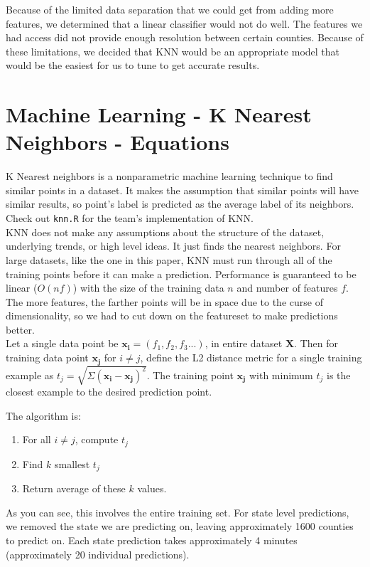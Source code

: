\documentclass[11pt]{article}
\begin{document}
Because of the limited data separation that we could get from adding more features, we determined that a linear classifier would not do well. The features we had access did not provide enough resolution between certain counties. Because of these limitations, we decided that KNN would be an appropriate model that would be the easiest for us to tune to get accurate results.
\newpage

\section*{Machine Learning - K Nearest Neighbors - Equations}
K Nearest neighbors is a nonparametric machine learning technique to find similar points in a dataset. It makes the assumption that similar points will have similar results, so point's label is predicted as the average label of its neighbors. Check out \texttt{knn.R} for the team's implementation of KNN. \\ 
KNN does not make any assumptions about the structure of the dataset, underlying trends, or high level ideas. It just finds the nearest neighbors. For large datasets, like the one in this paper, KNN must run through all of the training points before it can make a prediction. Performance is guaranteed to be linear ($O(nf)$) with the size of the training data $n$ and number of features $f$. The more features, the farther points will be in space due to the curse of dimensionality, so we had to cut down on the featureset to make predictions better. \\ 

Let a single data point be $\mathbf{x_i} = (f_1, f_2, f_3...)$, in entire dataset $\mathbf{X}$. Then for training data point $\mathbf{x_j}$ for $i \neq j$, define the L2 distance metric for a single training example as $t_j = \sqrt{\Sigma(\mathbf{x_i} - \mathbf{x_j})^2}$. The training point $\mathbf{x_j}$ with minimum $t_j$ is the closest example to the desired prediction point. 

The algorithm is: 

\begin{enumerate}
\item For all $i \neq j$, compute $t_j$ 
\item Find $k$ smallest $t_j$ 
\item Return average of these $k$ values. 
\end{enumerate}

As you can see, this involves the entire training set. For state level predictions, we removed the state we are predicting on, leaving approximately 1600 counties to predict on. Each state prediction takes approximately 4 minutes (approximately 20 individual predictions). 
\end{document}
